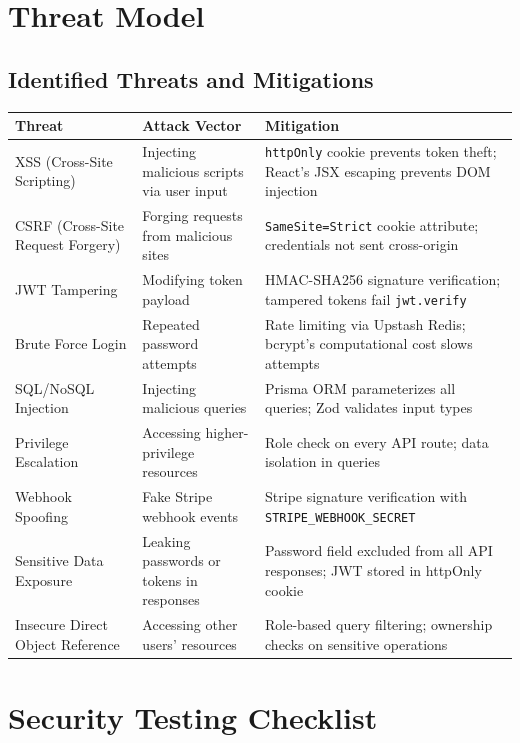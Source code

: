 \documentclass[12pt,a4paper]{report}
\begin{document}
\section{Threat Model}

\subsection{Identified Threats and Mitigations}

\begin{center}
\begin{longtable}{lp{4cm}p{5cm}}
  \toprule
  \textbf{Threat} & \textbf{Attack Vector} & \textbf{Mitigation} \\
  \midrule
  \endhead
  XSS (Cross-Site Scripting) & Injecting malicious scripts via user input & \texttt{httpOnly} cookie prevents token theft; React's JSX escaping prevents DOM injection \\
  CSRF (Cross-Site Request Forgery) & Forging requests from malicious sites & \texttt{SameSite=Strict} cookie attribute; credentials not sent cross-origin \\
  JWT Tampering & Modifying token payload & HMAC-SHA256 signature verification; tampered tokens fail \texttt{jwt.verify} \\
  Brute Force Login & Repeated password attempts & Rate limiting via Upstash Redis; bcrypt's computational cost slows attempts \\
  SQL/NoSQL Injection & Injecting malicious queries & Prisma ORM parameterizes all queries; Zod validates input types \\
  Privilege Escalation & Accessing higher-privilege resources & Role check on every API route; data isolation in queries \\
  Webhook Spoofing & Fake Stripe webhook events & Stripe signature verification with \texttt{STRIPE\_WEBHOOK\_SECRET} \\
  Sensitive Data Exposure & Leaking passwords or tokens in responses & Password field excluded from all API responses; JWT stored in httpOnly cookie \\
  Insecure Direct Object Reference & Accessing other users' resources & Role-based query filtering; ownership checks on sensitive operations \\
  \bottomrule
\end{longtable}
\end{center}

\section{Security Testing Checklist}
\end{document}
